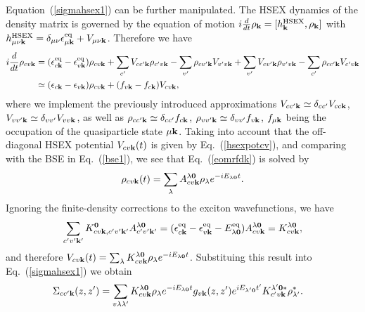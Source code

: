 \documentclass[twocolumn,aps,a4paper,superscriptaddress]{revtex4-2}
\begin{document}
\begin{widetext}
Equation~(\ref{sigmahsex1}) can be further manipulated.
The HSEX dynamics of the density matrix is governed by the equation of motion
$i\frac{d}{dt}\rho_{{\mathbf k}}=[h^{\rm HSEX}_{{\mathbf k}},\rho_{{\mathbf k}}]$ with
$h^{\rm
HSEX}_{\mu\nu{\mathbf k}}=\delta_{\mu\nu}\epsilon^{\rm eq}_{\mu{\mathbf k}}+V_{\mu\nu{\mathbf k}}$.
Therefore we have
\begin{align}
i\frac{d}{dt}\rho_{cv{\mathbf k}}&=(\epsilon^{\rm eq}_{c{\mathbf k}}-\epsilon^{\rm eq}_{v{\mathbf k}})\rho_{cv{\mathbf k}}+
\sum_{c'}V_{cc'{\mathbf k}}\rho_{c'v{\mathbf k}}-\sum_{v'}\rho_{cv'{\mathbf k}}V_{v'v{\mathbf k}}
+
\sum_{v'}V_{cv'{\mathbf k}}\rho_{v'v{\mathbf k}}-\sum_{c'}\rho_{cc'{\mathbf k}}V_{c'v{\mathbf k}}
\nonumber\\
&\simeq
(\epsilon_{c{\mathbf k}}-\epsilon_{v{\mathbf k}})\rho_{cv{\mathbf k}}+(f_{v{\mathbf k}}-f_{c{\mathbf k}})V_{cv{\mathbf k}},
\label{eomrfdk}
\end{align}
where we implement the previously introduced approximations  $V_{cc'{\mathbf k}}\simeq
\delta_{cc'}V_{cc{\mathbf k}}$, $V_{vv'{\mathbf k}}\simeq
\delta_{vv'}V_{vv{\mathbf k}}$, as well as
$\rho_{cc'{\mathbf k}}\simeq \delta_{cc'}f_{c{\mathbf k}}$,
$\rho_{vv'{\mathbf k}}\simeq \delta_{vv'}f_{v{\mathbf k}}$, $f_{\mu{\mathbf k}}$ being the
occupation of the quasiparticle state $\mu{\mathbf k}$.
Taking into account that the off-diagonal
HSEX potential $V_{cv{\mathbf k}}(t)$ is given by Eq.~(\ref{hsexpotcv}),
and comparing with the BSE in Eq.~(\ref{bse1}), we
see that
Eq.~(\ref{eomrfdk}) is solved by
\begin{align}
\rho_{cv{\mathbf k}}(t)=\sum_{\lambda}A^{\lambda\mathbf 0}_{cv{\mathbf k}}\rho_{\lambda}e^{-iE_{\lambda\mathbf 0}t}.
\end{align}
Ignoring the finite-density corrections to the
exciton wavefunctions, we have
\begin{align}
\sum_{c'v'{\mathbf k}'}K^{\mathbf 0}_{cv{\mathbf k},c'v'{\mathbf k}'}
A^{\lambda\mathbf 0}_{c'v'{\mathbf k}'}=(\epsilon^{\rm eq}_{c{\mathbf k}}-\epsilon^{\rm
eq}_{v{\mathbf k}}-E_{\lambda\mathbf 0}^{\rm eq})A^{\lambda\mathbf 0}_{cv{\mathbf k}}=K^{\lambda\mathbf 0}_{cv{\mathbf k}},
\end{align}
and therefore
$V_{cv{\mathbf k}}(t)=\sum_{\lambda}K^{\lambda\mathbf 0}_{cv{\mathbf k}}\rho_{\lambda}e^{-iE_{\lambda\mathbf 0}t}$.
Substituing this result into Eq.~(\ref{sigmahsex1}) we obtain
\begin{align}
\Sigma_{cc'{\mathbf k}}(z,z')&=
\sum_{v\lambda\lambda'}
K^{\lambda\mathbf 0}_{cv{\mathbf k}}\rho_{\lambda}e^{-iE_{\lambda\mathbf 0}t}
g_{v{\mathbf k}}(z,z')e^{iE_{\lambda'\mathbf 0}t'}
K^{\lambda'\mathbf 0\ast}_{c'v{\mathbf k}}\rho^{\ast}_{\lambda'}.
\label{shsexk}
\end{align}


\end{widetext}
\end{document}
